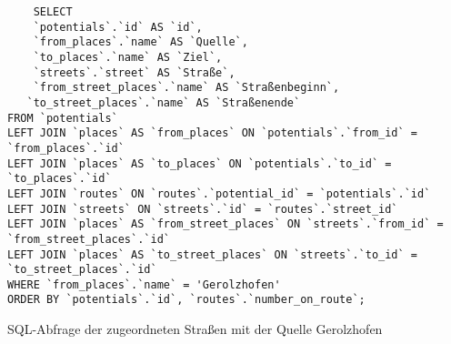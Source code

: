 \begin{listing}[htbp]
\begin{verbatim}
    SELECT 
	`potentials`.`id` AS `id`,
	`from_places`.`name` AS `Quelle`, 
	`to_places`.`name` AS `Ziel`,
	`streets`.`street` AS `Straße`,
	`from_street_places`.`name` AS `Straßenbeginn`,
   `to_street_places`.`name` AS `Straßenende`
FROM `potentials`
LEFT JOIN `places` AS `from_places` ON `potentials`.`from_id` = `from_places`.`id`
LEFT JOIN `places` AS `to_places` ON `potentials`.`to_id` = `to_places`.`id`
LEFT JOIN `routes` ON `routes`.`potential_id` = `potentials`.`id`
LEFT JOIN `streets` ON `streets`.`id` = `routes`.`street_id`
LEFT JOIN `places` AS `from_street_places` ON `streets`.`from_id` = `from_street_places`.`id`
LEFT JOIN `places` AS `to_street_places` ON `streets`.`to_id` = `to_street_places`.`id`
WHERE `from_places`.`name` = 'Gerolzhofen'
ORDER BY `potentials`.`id`, `routes`.`number_on_route`;
\end{verbatim}
\caption{SQL-Abfrage der zugeordneten Straßen mit der Quelle Gerolzhofen}\label{lst-rt-gerolzhofen}
\end{listing}


